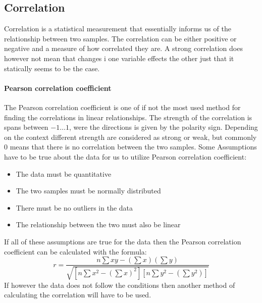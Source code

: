 \subsection{Correlation}
Correlation is a statistical measurement that essentially informs us of the relationship between two samples. The correlation can be either positive or negative and a measure of how correlated they are. A strong correlation does however not mean that changes i one variable effects the other just that it statically seems to be the case.
\paragraph{Pearson correlation coefficient} The Pearson correlation coefficient is one of if not the most used method for finding the correlations in linear relationships. The strength of the correlation is spans between $-1 \dotsc 1$, were the directions is given by the polarity sign. Depending on the context different strength are considered as strong or weak, but commonly 0 means that there is no correlation between the two samples. Some Assumptions have to be true about the data for us to utilize Pearson correlation coefficient:
\begin{itemize}
    \item The data must be quantitative
    \item The two samples must be normally distributed
    \item There must be no outliers in the data
    \item The relationship between the two must also be linear
\end{itemize}
If all of these assumptions are true for the data then the Pearson correlation coefficient can be calculated with the formula:
$$r=\frac{n\sum{xy- (\sum{x})(\sum{y})}}{\sqrt{[n\sum{x^2}-(\sum{x})^2][n\sum{y^2}-(\sum{y}^2)]}}$$
If however the data does not follow the conditions then another method of calculating the correlation will have to be used. 
